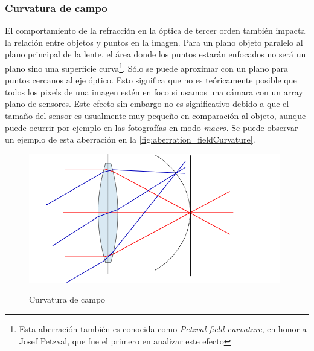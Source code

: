 \subsubsection{Curvatura de campo}
El comportamiento de la refracción en la óptica de tercer orden también impacta la relación entre objetos y puntos en la imagen. Para un plano objeto paralelo al plano principal de la lente, el área donde los puntos estarán enfocados no será un plano sino una superficie curva\footnote{Esta aberración también es conocida como \emph{Petzval field curvature}, en honor a Josef Petzval, que fue el primero en analizar este efecto}. Sólo se puede aproximar con un plano para puntos cercanos al eje óptico. Esto significa que no es teóricamente posible que todos los pixels de una imagen estén en foco si usamos una cámara con un array plano de sensores. Este efecto sin embargo no es significativo debido a que el tamaño del sensor es usualmente muy pequeño en comparación al objeto, aunque puede ocurrir por ejemplo en las fotografías en modo \emph{macro}. Se puede observar un ejemplo de esta aberración en la \autoref{fig:aberration_fieldCurvature}.
\begin{figure}[bth]
    \myfloatalign
        {\includegraphics[width=0.8\linewidth]{images/aberration_fieldCurvature}}
        \caption{Curvatura de campo}
        \label{fig:aberration_fieldCurvature}
\end{figure}

